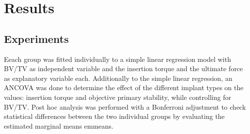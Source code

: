 \documentclass[12pt, a4paper, twoside]{report}
\begin{document}
\chapter{Results}
%
\section{Experiments}
%
Eeach group was fitted individually to a simple linear regression model with BV/TV as independent variable and the insertion torque and the ultimate force as explanatory variable each.
Additionally to the simple linear regression, an ANCOVA was done to determine the effect of the different implant types on the values: insertion torque and objective primary stability, while controlling for BV/TV.
Post hoc analysis was performed with a Bonferroni adjustment to check statistical differences between the two individual groups by evaluating the estimated marginal means emmeans.
%
\end{document}
